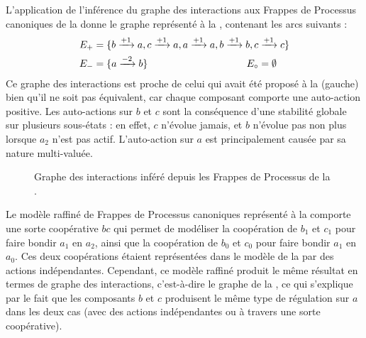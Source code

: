 \begin{example}
  L'application de l'inférence du graphe des interactions aux Frappes de Processus canoniques
  de la  donne le graphe représenté à la ,
  contenant les arcs suivants :
  \begin{align*}
    E_+ &= \{b \xrightarrow{+ 1} a, c \xrightarrow{+ 1} a, a \xrightarrow{+ 1} a,
      b \xrightarrow{+ 1} b, c \xrightarrow{+ 1} c\} \\
    E_- &= \{a \xrightarrow{- 2} b\} \qquad\qquad\qquad\qquad\qquad
    E_\circ = \emptyset
  \end{align*}
  Ce graphe des interactions est proche de celui qui avait été proposé
  à la (gauche)  bien qu'il ne soit pas équivalent,
  car chaque composant comporte une auto-action positive.
  Les auto-actions sur $b$ et $c$ sont la conséquence d'une stabilité globale
  sur plusieurs sous-états : en effet, $c$ n'évolue jamais,
  et $b$ n'évolue pas non plus lorsque $a_2$ n'est pas actif.
  L'auto-action sur $a$ est principalement causée par sa nature multi-valuée.
  
  \begin{figure}[ht]
  \centering
  \caption{%
    Graphe des interactions inféré depuis les Frappes de Processus de la .
  }
  \end{figure}
\end{example}

\begin{example}
  Le modèle raffiné de Frappes de Processus canoniques représenté à la 
  comporte une sorte coopérative $bc$ qui permet de modéliser la coopération
  de $b_1$ et $c_1$ pour faire bondir $a_1$ en $a_2$,
  ainsi que la coopération de $b_0$ et $c_0$ pour faire bondir $a_1$ en $a_0$.
  Ces deux coopérations étaient représentées dans le modèle de la 
  par des actions indépendantes.
  Cependant, ce modèle raffiné produit le même résultat en termes de graphe des interactions,
  c'est-à-dire le graphe de la ,
  ce qui s'explique par le fait que les composants $b$ et $c$ produisent le même type
  de régulation sur $a$ dans les deux cas (avec des actions indépendantes ou à travers une sorte
  coopérative).
\end{example}

